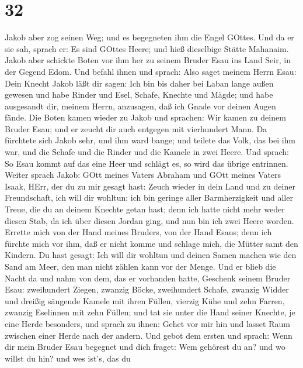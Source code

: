 \hypertarget{section-31}{%
\section{32}\label{section-31}}

 Jakob aber zog seinen Weg; und es begegneten ihm die Engel
GOttes.  Und da er sie sah, sprach er: Es sind GOttes Heere;
und hieß dieselbige Stätte Mahanaim.  Jakob aber schickte
Boten vor ihm her zu seinem Bruder Esau ins Land Seir, in der Gegend
Edom.  Und befahl ihnen und sprach: Also saget meinem Herrn
Esau: Dein Knecht Jakob läßt dir sagen: Ich bin bis daher bei Laban
lange außen gewesen  und habe Rinder und Esel, Schafe,
Knechte und Mägde; und habe ausgesandt dir, meinem Herrn, anzusagen, daß
ich Gnade vor deinen Augen fände.  Die Boten kamen wieder zu
Jakob und sprachen: Wir kamen zu deinem Bruder Esau; und er zeucht dir
auch entgegen mit vierhundert Mann.  Da fürchtete sich Jakob
sehr, und ihm ward bange; und teilete das Volk, das bei ihm war, und die
Schafe und die Rinder und die Kamele in zwei Heere.  Und
sprach: So Esau kommt auf das eine Heer und schlägt es, so wird das
übrige entrinnen.  Weiter sprach Jakob: GOtt meines Vaters
Abraham und GOtt meines Vaters Isaak, HErr, der du zu mir gesagt hast:
Zeuch wieder in dein Land und zu deiner Freundschaft, ich will dir
wohltun:  ich bin geringe aller Barmherzigkeit und aller
Treue, die du an deinem Knechte getan hast; denn ich hatte nicht mehr
weder diesen Stab, da ich über diesen Jordan ging, und nun bin ich zwei
Heere worden.  Errette mich von der Hand meines Bruders,
von der Hand Esaus; denn ich fürchte mich vor ihm, daß er nicht komme
und schlage mich, die Mütter samt den Kindern.  Du hast
gesagt: Ich will dir wohltun und deinen Samen machen wie den Sand am
Meer, den man nicht zählen kann vor der Menge.  Und er
blieb die Nacht da und nahm von dem, das er vorhanden hatte, Geschenk
seinem Bruder Esau:  zweihundert Ziegen, zwanzig Böcke,
zweihundert Schafe, zwanzig Widder  und dreißig säugende
Kamele mit ihren Füllen, vierzig Kühe und zehn Farren, zwanzig Eselinnen
mit zehn Füllen;  und tat sie unter die Hand seiner
Knechte, je eine Herde besonders, und sprach zu ihnen: Gehet vor mir hin
und lasset Raum zwischen einer Herde nach der andern.  Und
gebot dem ersten und sprach: Wenn dir mein Bruder Esau begegnet und dich
fraget: Wem gehörest du an? und wo willst du hin? und wes ist's, das du
